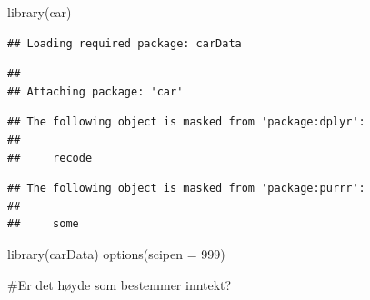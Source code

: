\documentclass[
  12pt,
  norsk,
]{article}
\newenvironment{Shaded}{\begin{snugshade}}{\end{snugshade}}
\newcommand{\AttributeTok}[1]{\textcolor[rgb]{0.77,0.63,0.00}{#1}}
\newcommand{\DecValTok}[1]{\textcolor[rgb]{0.00,0.00,0.81}{#1}}
\newcommand{\FunctionTok}[1]{\textcolor[rgb]{0.00,0.00,0.00}{#1}}
\newcommand{\NormalTok}[1]{#1}
\begin{document}
\begin{Shaded}
\begin{Highlighting}[]
\FunctionTok{library}\NormalTok{(car)}
\end{Highlighting}
\end{Shaded}

\begin{verbatim}
## Loading required package: carData
\end{verbatim}

\begin{verbatim}
## 
## Attaching package: 'car'
\end{verbatim}

\begin{verbatim}
## The following object is masked from 'package:dplyr':
## 
##     recode
\end{verbatim}

\begin{verbatim}
## The following object is masked from 'package:purrr':
## 
##     some
\end{verbatim}

\begin{Shaded}
\begin{Highlighting}[]
\FunctionTok{library}\NormalTok{(carData)}
\FunctionTok{options}\NormalTok{(}\AttributeTok{scipen =} \DecValTok{999}\NormalTok{)}
\end{Highlighting}
\end{Shaded}

\#Er det høyde som bestemmer inntekt?
\end{document}
